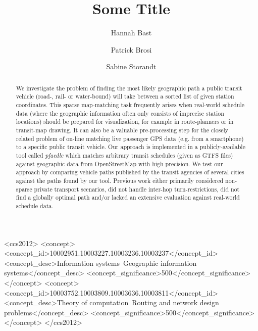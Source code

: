 \documentclass[sigconf]{acmart}
\begin{document}
\title{Some Title}

\author{Hannah Bast}

\author{Patrick Brosi}

\author{Sabine Storandt}

\begin{abstract}
We investigate the problem of finding the most likely geographic path a public transit vehicle (road-, rail- or water-bound) will take between a sorted list of given station coordinates. This sparse map-matching task frequently arises when real-world schedule data (where the geographic information often only consists of imprecise station locations) should be prepared for visualization, for example in route-planners or in transit-map drawing. It can also be a valuable pre-processing step for the closely related problem of on-line matching live passenger GPS data (e.g. from a smartphone) to a specific public transit vehicle. Our approach is implemented in a publicly-available tool called \emph{pfaedle} which matches arbitrary transit schedules (given as GTFS files) against geographic data from OpenStreetMap with high precision. We test our approach by comparing vehicle paths published by the transit agencies of several cities against the paths found by our tool. Previous work either primarily considered non-sparse private transport scenarios, did not handle inter-hop turn-restrictions, did not find a globally optimal path and/or lacked an extensive evaluation against real-world schedule data.
\end{abstract}

%
%
\begin{CCSXML}
<ccs2012>
<concept>
<concept_id>10002951.10003227.10003236.10003237</concept_id>
<concept_desc>Information systems~Geographic information systems</concept_desc>
<concept_significance>500</concept_significance>
</concept>
<concept>
<concept_id>10003752.10003809.10003636.10003811</concept_id>
<concept_desc>Theory of computation~Routing and network design problems</concept_desc>
<concept_significance>500</concept_significance>
</concept>
</ccs2012>
\end{CCSXML}
\end{document}

